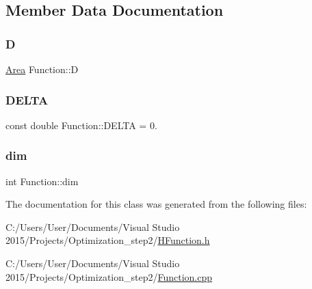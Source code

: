 \subsection{Member Data Documentation}
\mbox{\label{class_function_a03b771b5e5eb0acd456cd897b04edbab}} 
\subsubsection{\texorpdfstring{D}{D}}
{\footnotesize\ttfamily \hyperlink{class_area}{Area} Function\+::D\hspace{0.3cm}{\ttfamily [protected]}}

\mbox{\label{class_function_af29cd370469d8dbea0a7b5c3b0925323}} 
\subsubsection{\texorpdfstring{D\+E\+L\+TA}{DELTA}}
{\footnotesize\ttfamily const double Function\+::\+D\+E\+L\+TA = 0.\hspace{0.3cm}{\ttfamily [protected]}}

\mbox{\label{class_function_a4b8560408fbefc8a791b70f35959d3a1}} 
\subsubsection{\texorpdfstring{dim}{dim}}
{\footnotesize\ttfamily int Function\+::dim\hspace{0.3cm}{\ttfamily [protected]}}



The documentation for this class was generated from the following files\+:\begin{DoxyCompactItemize}
\item 
C\+:/\+Users/\+User/\+Documents/\+Visual Studio 2015/\+Projects/\+Optimization\+\_\+step2/\hyperlink{_h_function_8h}{H\+Function.\+h}\item 
C\+:/\+Users/\+User/\+Documents/\+Visual Studio 2015/\+Projects/\+Optimization\+\_\+step2/\hyperlink{_function_8cpp}{Function.\+cpp}\end{DoxyCompactItemize}
